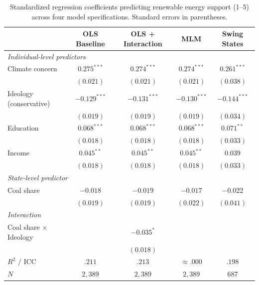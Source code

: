 \documentclass[9pt,twoside]{pnas-new}
\begin{document}
\begin{table}[t!]
\centering
\caption{Standardized regression coefficients predicting renewable energy support
(1--5) across four model specifications. Standard errors in parentheses.}
\label{tab:models}
\begin{tabular*}{\textwidth}{@{\extracolsep{\fill}}lcccc@{}}
 & OLS Baseline & OLS + Interaction & MLM & Swing States \\
\midrule
\multicolumn{5}{l}{\textit{Individual-level predictors}} \\
Climate concern
  & $0.275^{***}$ & $0.274^{***}$ & $0.274^{***}$ & $0.261^{***}$ \\
  & $(0.021)$     & $(0.021)$     & $(0.021)$     & $(0.038)$     \\
Ideology (conservative)
  & $-0.129^{***}$ & $-0.131^{***}$ & $-0.130^{***}$ & $-0.144^{***}$ \\
  & $(0.019)$      & $(0.019)$      & $(0.019)$      & $(0.034)$      \\
Education
  & $0.068^{***}$ & $0.068^{***}$ & $0.068^{***}$ & $0.071^{**}$ \\
  & $(0.018)$     & $(0.018)$     & $(0.018)$     & $(0.033)$    \\
Income
  & $0.045^{**}$ & $0.045^{**}$ & $0.045^{**}$ & $0.039$ \\
  & $(0.018)$    & $(0.018)$    & $(0.018)$    & $(0.033)$ \\
\multicolumn{5}{l}{\textit{State-level predictor}} \\
Coal share
  & $-0.018$ & $-0.019$ & $-0.017$ & $-0.022$ \\
  & $(0.019)$ & $(0.019)$ & $(0.022)$ & $(0.041)$ \\
\multicolumn{5}{l}{\textit{Interaction}} \\
Coal share $\times$ Ideology
  & & $-0.035^{*}$ & & \\
  & & $(0.018)$    & & \\
\midrule
$R^2$ / ICC & $.211$ & $.213$ & $\approx .000$ & $.198$ \\
$N$         & $2{,}389$ & $2{,}389$ & $2{,}389$ & $687$ \\
\bottomrule
\end{tabular*}
\end{table}
\end{document}
